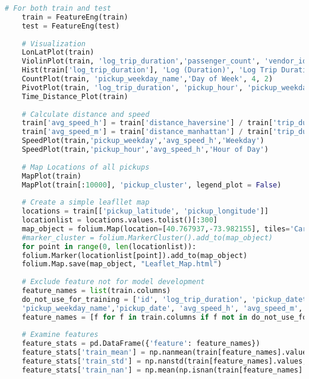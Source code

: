 \documentclass[12pt,report]{ucdavisthesis}
\begin{document}
\begin{lstlisting}[language=Python, caption=code1]
    # For both train and test
    train = FeatureEng(train)
    test = FeatureEng(test)
    
    # Visualization           
    LonLatPlot(train)                                                            #6  Lat_Lon_Plot          
    ViolinPlot(train, 'log_trip_duration','passenger_count', 'vendor_id')
    Hist(train['log_trip_duration'], 'Log (Duration)', 'Log Trip Duration His')  #1   Log Trip Duration His
    CountPlot(train, 'pickup_weekday_name','Day of Week', 4, 2)                  #2  Day of Week_Count_Plot
    PivotPlot(train, 'log_trip_duration', 'pickup_hour', 'pickup_weekday')       #7  pickup_hour_and_pickup_weekday_Pivot
    Time_Distance_Plot(train)                                                    #8  Time_distance_pivot
    
    # Calculate distance and speed
    train['avg_speed_h'] = train['distance_haversine'] / train['trip_duration'] * 3600# in the unit of km/hr
    train['avg_speed_m'] = train['distance_manhattan'] / train['trip_duration'] * 3600# in the unit of km/hr
    SpeedPlot(train,'pickup_weekday','avg_speed_h','Weekday')
    SpeedPlot(train,'pickup_hour','avg_speed_h','Hour of Day')
    
    # Map Locations of all pickups
    MapPlot(train)
    MapPlot(train[:10000], 'pickup_cluster', legend_plot = False)
    
    # Create a simple leafllet map
    locations = train[['pickup_latitude', 'pickup_longitude']]
    locationlist = locations.values.tolist()[:300]
    map_object = folium.Map(location=[40.767937,-73.982155], tiles='CartoDB dark_matter', zoom_start=12)
    #marker_cluster = folium.MarkerCluster().add_to(map_object)
    for point in range(0, len(locationlist)):
    folium.Marker(locationlist[point]).add_to(map_object)
    folium.Map.save(map_object, "Leaflet_Map.html")
    
    # Exclude feature not for model development
    feature_names = list(train.columns)
    do_not_use_for_training = ['id', 'log_trip_duration', 'pickup_datetime', 'dropoff_datetime', 'trip_duration', 
    'pickup_weekday_name','pickup_date', 'avg_speed_h', 'avg_speed_m','store_and_fwd_flag']
    feature_names = [f for f in train.columns if f not in do_not_use_for_training]
    
    # Examine features
    feature_stats = pd.DataFrame({'feature': feature_names})
    feature_stats['train_mean'] = np.nanmean(train[feature_names].values, axis=0)
    feature_stats['train_std'] = np.nanstd(train[feature_names].values, axis=0)
    feature_stats['train_nan'] = np.mean(np.isnan(train[feature_names].values), axis=0)
    

\end{lstlisting}
\end{document}
